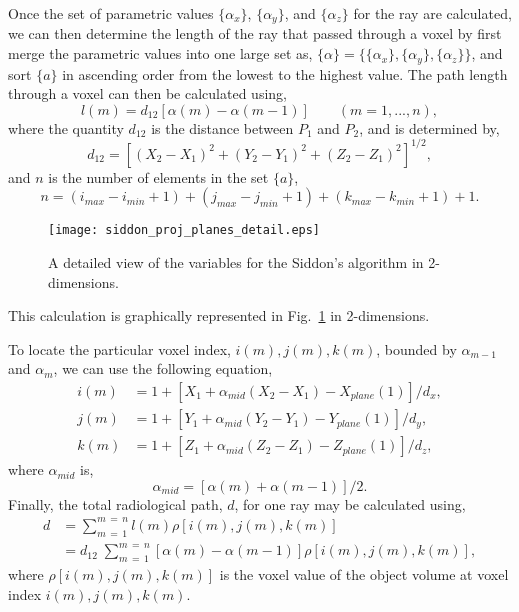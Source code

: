 Once the set of parametric values $\{\alpha_x\}$, $\{\alpha_y\}$, and $\{\alpha_z\}$ for the ray are calculated, we can then determine the length of the ray that passed through a voxel by first merge the parametric values into one large set as, $\{ \alpha \}  = \{ \{\alpha_x\}, \{\alpha_y\}, \{\alpha_z\} \}$, and sort $\{ a \}$ in ascending order from the lowest to the highest value.  The path length through a voxel can then be calculated using, 
%
\begin{equation}
l(m) = d_{12} \left[ \alpha(m) - \alpha(m-1) \right] \qquad (m = 1, ..., n),
\label{eq:siddon_length}
\end{equation}
%
where the quantity $d_{12}$ is the distance between $P_1$ and $P_2$, and is determined by,
%
\begin{equation}
d_{12} = \left[ (X_2 - X_1)^2 + (Y_2 - Y_1)^2 + (Z_2 - Z_1)^2 \right]^{1/2}, 
\label{eq:siddon_d12}
\end{equation}
%
and $n$ is the number of elements in the set $\{ a \}$,
%
\begin{equation}
n = (i_{max} - i_{min} + 1) + (j_{max} - j_{min}+1) + (k_{max}-k_{min}+1) + 1.
\label{eq:siddon_n}
\end{equation}
%
\begin{figure}[ht]
\centering
\texttt{[image: siddon\_proj\_planes\_detail.eps]}
\caption{A detailed view of the variables for the Siddon's algorithm in 2-dimensions.}
\label{fig:siddon_plane_detail}
\end{figure}
%
This calculation is graphically represented in Fig.~\ref{fig:siddon_plane_detail} in 2-dimensions.

To locate the particular voxel index, $i(m), j(m), k(m)$, bounded by $\alpha_{m-1}$ and $\alpha_m$, we can use the following equation,
\begin{equation}
\begin{aligned}
i(m) &= 1 + \left[ X_1 + \alpha_{mid}(X_2 - X_1) - X_{plane}(1) \right] /d_x, \\
j(m) &= 1 + \left[ Y_1 + \alpha_{mid}(Y_2 - Y_1) - Y_{plane}(1) \right] /d_y, \\
k(m) &= 1 + \left[ Z_1 + \alpha_{mid}(Z_2 - Z_1) - Z_{plane}(1) \right] /d_z,
\end{aligned}
\label{eq:siddon_voxel}
\end{equation}
where $\alpha_{mid}$ is,
\begin{equation}
\alpha_{mid} = \left[ \alpha(m) + \alpha(m-1) \right] /2.
\label{eq:siddon_alphamid}
\end{equation}
%
Finally, the total radiological path, $d$, for one ray may be calculated using,
%
\begin{equation}
\begin{aligned}
d &= \sum\limits_{m \, = \, 1}^{m \, = \, n} l(m) \rho\left[ i(m), j(m), k(m) \right] \\
  &= d_{12} \; \sum\limits_{m \, = \, 1}^{m \, = \, n} \left[ \alpha(m) - \alpha(m-1) \right] \rho \left[ i(m), j(m), k(m) \right],
\end{aligned}
\label{eq:siddon_path}
\end{equation}
%
where $\rho \left[ i(m), j(m), k(m) \right]$ is the voxel value of the object volume at voxel index $i(m), j(m), k(m)$.

